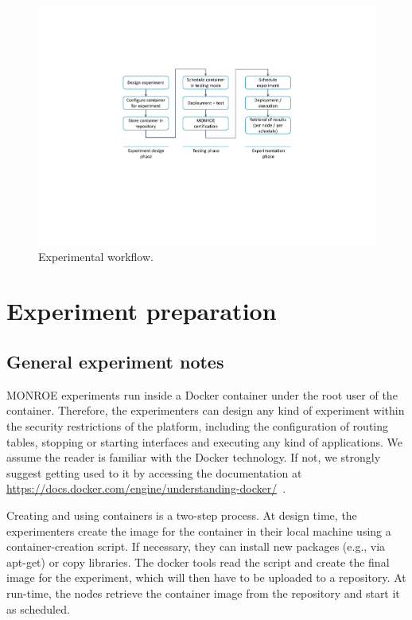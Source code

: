 \documentclass[a4paper,10pt]{article}
\begin{document}
\begin{figure}[tp]
	\centering
	\includegraphics[width=1.0\textwidth,trim={7cm 7.5cm 7cm 5cm}]{ExperimentWorkflow.pdf}
	\caption{Experimental workflow.}
	\label{fig:ExperimentWorkflow}
\end{figure}



\section{Experiment preparation}
\label{sec:experimentPreparation}


\subsection{General experiment notes}
\label{subsec:generalExperimentNotes}

MONROE experiments run inside a Docker container under the root user of the container.
Therefore, the experimenters can design any kind of experiment within the security restrictions of the platform, including the configuration of routing tables, stopping or starting interfaces and executing any kind of applications.
We assume the reader is familiar with the Docker technology.
If not, we strongly suggest getting used to it by accessing the documentation at \url{https://docs.docker.com/engine/understanding-docker/}~.

Creating and using containers is a two-step process.
At design time, the experimenters create the image for the container in their local machine using a container-creation script.
If necessary, they can install new packages (e.g., via apt-get) or copy libraries.
The docker tools read the script and create the final image for the experiment, which will then have to be uploaded to a repository.
At run-time, the nodes retrieve the container image from the repository and start it as scheduled.
\end{document}
